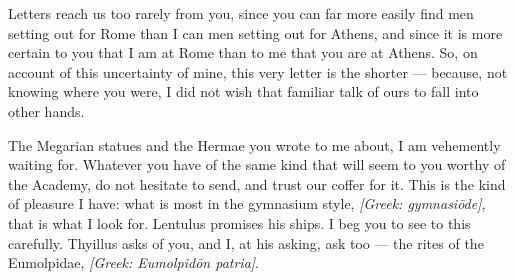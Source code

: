 

 Letters reach us too rarely from you, since you can far more easily find men setting out for Rome than I can men setting out for Athens, and since it is more certain to you that I am at Rome than to me that you are at Athens. So, on account of this uncertainty of mine, this very letter is the shorter --- because, not knowing where you were, I did not wish that familiar talk of ours to fall into other hands.

 The Megarian statues and the Hermae you wrote to me about, I am vehemently waiting for. Whatever you have of the same kind that will seem to you worthy of the Academy, do not hesitate to send, and trust our coffer for it. This is the kind of pleasure I have: what is most in the gymnasium style, \textit{[Greek: gymnasi\=ode]}, that is what I look for. Lentulus promises his ships. I beg you to see to this carefully. Thyillus asks of you, and I, at his asking, ask too --- the rites of the Eumolpidae, \textit{[Greek: Eumolpid\=on patria]}.
